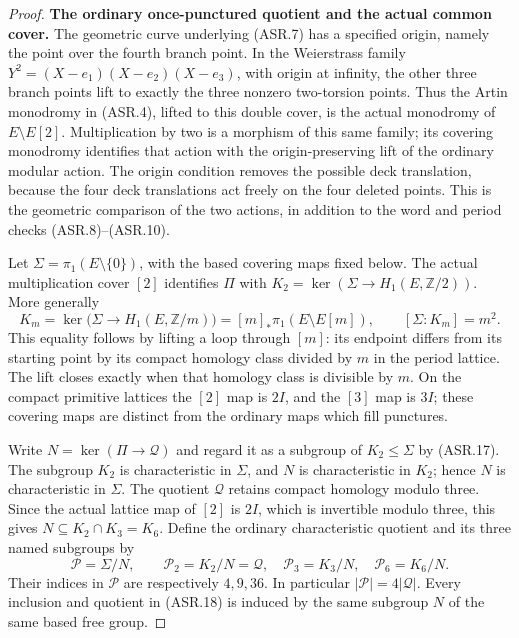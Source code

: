 \begin{proof}
\par\medskip\noindent\textbf{The ordinary once-punctured quotient and the actual common cover.}
The geometric curve underlying (ASR.7) has a specified origin,
namely the point over the fourth branch point.  In the
Weierstrass family
$Y^2=(X-e_1)(X-e_2)(X-e_3)$, with origin at infinity,
the other three branch points lift to exactly the three
nonzero two-torsion points.  Thus the Artin monodromy in
(ASR.4), lifted to this double cover, is the actual monodromy
of $E\setminus E[2]$.
Multiplication by two is a morphism of this same family;
its covering monodromy identifies that action with the
origin-preserving lift of the ordinary modular action.
The origin condition removes the possible deck translation,
because the four deck translations act freely on the four
deleted points.  This is the geometric comparison of the
two actions, in addition to the word and period checks
(ASR.8)--(ASR.10).

Let $\Sigma=\pi_1(E\setminus\{0\})$, with the based
covering maps fixed below.  The actual multiplication
cover $[2]$ identifies $\Pi$ with
$K_2=\ker(\Sigma\to H_1(E,\mathbb Z/2))$.
More generally
\[
 K_m=\ker\bigl(\Sigma\to H_1(E,\mathbb Z/m)\bigr)
   =[m]_*\pi_1(E\setminus E[m]),\qquad [\Sigma:K_m]=m^2.
                                                        \tag{ASR.17}
\]
This equality follows by lifting a loop through $[m]$:
its endpoint differs from its starting point by its
compact homology class divided by $m$ in the period
lattice.  The lift closes exactly when that homology
class is divisible by $m$.
On the compact primitive lattices the $[2]$ map is
$2I$, and the $[3]$ map is $3I$; these covering maps
are distinct from the ordinary maps which fill punctures.

Write $N=\ker(\Pi\to\mathcal Q)$ and regard it as a
subgroup of $K_2\leq\Sigma$ by (ASR.17).
The subgroup $K_2$ is characteristic in $\Sigma$, and
$N$ is characteristic in $K_2$; hence $N$ is
characteristic in $\Sigma$.
The quotient $\mathcal Q$ retains compact homology
modulo three.  Since the actual lattice map of $[2]$
is $2I$, which is invertible modulo three, this gives
$N\subseteq K_2\cap K_3=K_6$.
Define the ordinary characteristic quotient and its
three named subgroups by
\[
 \mathcal P=\Sigma/N,\qquad
 \mathcal P_2=K_2/N=\mathcal Q,\quad
 \mathcal P_3=K_3/N,\quad
 \mathcal P_6=K_6/N.                                   \tag{ASR.18}
\]
Their indices in $\mathcal P$ are respectively
$4,9,36$.  In particular $|\mathcal P|=4|\mathcal Q|$.
Every inclusion and quotient in (ASR.18) is induced
by the same subgroup $N$ of the same based free group.


\end{proof}
